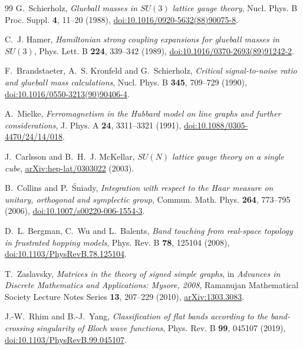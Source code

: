 \documentclass[11pt]{article}
\theoremstyle{plain}
\theoremstyle{definition}
\theoremstyle{remark}
\begin{document}
\begin{thebibliography}{99}
 G.~Schierholz,
  \emph{Glueball masses in $SU(3)$ lattice gauge theory},
  Nucl. Phys. B Proc. Suppl. \textbf{4}, 11--20 (1988),
  \href{https://doi.org/10.1016/0920-5632(88)90075-8}{doi:10.1016/0920-5632(88)90075-8}.

 C.~J. Hamer,
  \emph{Hamiltonian strong coupling expansions for glueball masses in
  $SU(3)$}, Phys. Lett. B \textbf{224}, 339--342 (1989),
  \href{https://doi.org/10.1016/0370-2693(89)91242-2}{doi:10.1016/0370-2693(89)91242-2}.

 F.~Brandstaeter, A.~S. Kronfeld and G.~Schierholz,
  \emph{Critical signal-to-noise ratio and glueball mass calculations},
  Nucl. Phys. B \textbf{345}, 709--729 (1990),
  \href{https://doi.org/10.1016/0550-3213(90)90406-4}{doi:10.1016/0550-3213(90)90406-4}.

 A.~Mielke,
  \emph{Ferromagnetism in the Hubbard model on line graphs and further
  considerations}, J. Phys. A \textbf{24}, 3311--3321 (1991),
  \href{https://doi.org/10.1088/0305-4470/24/14/018}{doi:10.1088/0305-4470/24/14/018}.

 J.~Carlsson and B.~H.~J. McKellar,
  \emph{$SU(N)$ lattice gauge theory on a single cube},
  \href{https://arxiv.org/abs/hep-lat/0303022}{arXiv:hep-lat/0303022} (2003).

 B.~Collins and P.~\'Sniady,
  \emph{Integration with respect to the Haar measure on unitary, orthogonal
  and symplectic group}, Commun. Math. Phys. \textbf{264}, 773--795 (2006),
  \href{https://doi.org/10.1007/s00220-006-1554-3}{doi:10.1007/s00220-006-1554-3}.

 D.~L. Bergman, C.~Wu and L.~Balents,
  \emph{Band touching from real-space topology in frustrated hopping models},
  Phys. Rev. B \textbf{78}, 125104 (2008),
  \href{https://doi.org/10.1103/PhysRevB.78.125104}{doi:10.1103/PhysRevB.78.125104}.

 T.~Zaslavsky,
  \emph{Matrices in the theory of signed simple graphs}, in
  \emph{Advances in Discrete Mathematics and Applications: Mysore, 2008},
  Ramanujan Mathematical Society Lecture Notes Series \textbf{13}, 207--229
  (2010), \href{https://arxiv.org/abs/1303.3083}{arXiv:1303.3083}.

 J.-W.~Rhim and B.-J.~Yang,
  \emph{Classification of flat bands according to the band-crossing
  singularity of Bloch wave functions}, Phys. Rev. B \textbf{99}, 045107
  (2019), \href{https://doi.org/10.1103/PhysRevB.99.045107}{doi:10.1103/PhysRevB.99.045107}.


\end{thebibliography}
\end{document}
